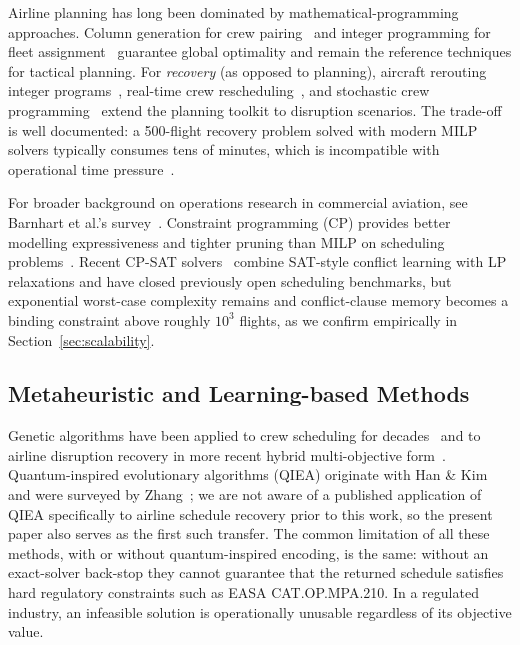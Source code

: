 \documentclass[12pt,number]{elsarticle}
\begin{document}
Airline planning has long been dominated by mathematical-programming approaches. Column generation for crew pairing~\cite{barnhart1998,desrosiers2005} and integer programming for fleet assignment~\cite{abara1989,hane1995,rexing2000,sherali2006} guarantee global optimality and remain the reference techniques for tactical planning. For \emph{recovery} (as opposed to planning), aircraft rerouting integer programs~\cite{rosenberger2003}, real-time crew rescheduling~\cite{stojkovic2002}, and stochastic crew programming~\cite{yen2006} extend the planning toolkit to disruption scenarios. The trade-off is well documented: a 500-flight recovery problem solved with modern MILP solvers typically consumes tens of minutes, which is incompatible with operational time pressure~\cite{ball2007,hu2024}.

For broader background on operations research in commercial aviation, see Barnhart et al.'s survey~\cite{barnhart2003}. Constraint programming (CP) provides better modelling expressiveness and tighter pruning than MILP on scheduling problems~\cite{rossi2006,laborie2018}. Recent CP-SAT solvers~\cite{perron2023} combine SAT-style conflict learning with LP relaxations and have closed previously open scheduling benchmarks, but exponential worst-case complexity remains and conflict-clause memory becomes a binding constraint above roughly $10^3$ flights, as we confirm empirically in Section~\ref{sec:scalability}.

\subsection{Metaheuristic and Learning-based Methods}

Genetic algorithms have been applied to crew scheduling for decades~\cite{levine1996,ozdemir2001} and to airline disruption recovery in more recent hybrid multi-objective form~\cite{liu2010}. Quantum-inspired evolutionary algorithms (QIEA) originate with Han \& Kim~\cite{han2002} and were surveyed by Zhang~\cite{zhang2011}; we are not aware of a published application of QIEA specifically to airline schedule recovery prior to this work, so the present paper also serves as the first such transfer. The common limitation of all these methods, with or without quantum-inspired encoding, is the same: without an exact-solver back-stop they cannot guarantee that the returned schedule satisfies hard regulatory constraints such as EASA CAT.OP.MPA.210. In a regulated industry, an infeasible solution is operationally unusable regardless of its objective value.
\end{document}
